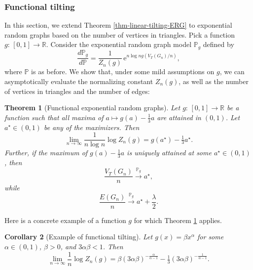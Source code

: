 \documentclass[bj,authoryear,noshowframe]{imsart}
\numberwithin{equation}{section}
\theoremstyle{plain}
\newtheorem{thm}{Theorem}[section]
\newtheorem{cor}[thm]{Corollary}
\theoremstyle{definition}
\newcommand{\sss}{\scriptscriptstyle}
\newcommand {\convpg}{\stackrel{\sss {\mathbb P}_g}{\longrightarrow}}
\begin{document}
\subsubsection{Functional tilting}
In this section, we extend Theorem \ref{thm-linear-tilting-ERG} to exponential random graphs based on the number of vertices in triangles. Pick a function $g\colon\,[0,1]\rightarrow \mathbb{R}$. Consider the exponential random graph model $\mathbb{P}_g$ defined by 
	\begin{equation}
	\label{eqn:250pm30mar22}
	\frac{d\mathbb{P}_g}{d\mathbb{P}} = \frac{1}{Z_n(g)}\, \mathrm{e}^{ n\log{n} g\left(V_{ T}(G_n)/n\right)},
	\end{equation}
where $\mathbb{P}$ is as before. We show that, under some mild assumptions on $g$, we can asymptotically evaluate the normalizing constant $Z_n(g)$, as well as the number of vertices in triangles and the number of edges:

\begin{thm}[Functional exponential random graphs]
\label{thm-func-tilting-ERG}
Let $g\colon\,[0,1]\rightarrow \mathbb{R}$ be a function such that all maxima of $a\mapsto g(a)-\tfrac13 a$ are attained in $(0,1)$. Let $a^\star \in (0,1)$ be any of the maximizers. Then
	\begin{equation}
	\label{universality:ergm}
	\lim_{n\rightarrow \infty} \frac{1}{n\log{n}}\log{Z_n(g)} = g(a^\star)-\tfrac13 a^\star.
	\end{equation}
Further, if the maximum of $g(a)-\tfrac13 a$ is {\em uniquely} attained at some $a^\star \in (0,1)$, then
	\begin{equation}
	\label{eqn:weddec20332pm}
	\frac{V_T(G_n)}{n}\convpg a^\star,
	\end{equation}
while
	\begin{equation}
	\label{eqn:weddec20333pm}
	\frac{E(G_n)}{n}\convpg a^\star+\frac{\lambda}{2}.
	\end{equation}
\end{thm} 

Here is a concrete example of a function $g$ for which Theorem \ref{thm-func-tilting-ERG} applies.

\begin{cor}[Example of functional tilting]
\label{cor:weddec20308pm}
Let $g(x)= \beta x^{\alpha}$ for some $\alpha \in (0,1)$, $\beta>0$, and $3\alpha \beta < 1$. Then
\begin{equation}
\label{eqn:thumar30107pm}
\lim_{n\rightarrow \infty}\frac{1}{n}\log{Z_n(g)}
= \beta (3\alpha \beta)^{-\frac{\alpha}{\alpha-1}} - \tfrac{1}{3}(3\alpha \beta)^{-\frac{1}{\alpha-1}}.
\end{equation}
\end{cor}
\end{document}
